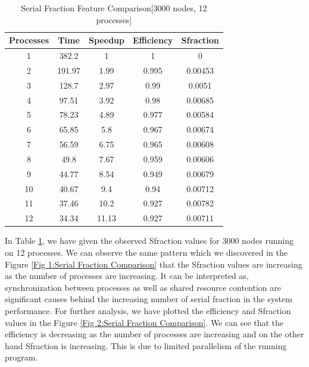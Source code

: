 \begin{table}[h!]
\caption{Serial Fraction Feature Comparison[3000 nodes, 12 processes]}
\label{tab:Table 2}
\centering
\begin{tabular}{|c|c|c|c|c|}
\hline
Processes & Time & Speedup & Efficiency & Sfraction\\
\hline
\hline
1&	382.2&	1&	1&	0\\
\hline

2&	191.97&	1.99&	0.995&	0.00453\\
\hline

3&	128.7&	2.97&	0.99&	0.0051\\
\hline

4&	97.51&	3.92&	0.98&	0.00685\\
\hline

5&	78.23&	4.89&	0.977&	0.00584\\
\hline

6&	65.85&	5.8&	0.967&	0.00674\\
\hline

7&	56.59&	6.75&	0.965&	0.00608\\
\hline

8&	49.8&	7.67&	0.959&	0.00606\\
\hline

9&	44.77&	8.54&	0.949&	0.00679\\
\hline

10&	40.67&	9.4&	0.94&	0.00712\\
\hline

11&	37.46&	10.2&	0.927&	0.00782\\
\hline

12&	34.34&	11.13&	0.927&	0.00711\\
\hline

\end{tabular}
\end{table}

In Table \ref{tab:Table 2}, we have given the observed Sfraction values for 3000 nodes running on 12 processes. We can observe the same pattern which we discovered in the Figure \ref{Fig 1:Serial Fraction Comparison} that the Sfraction values are increasing as the number of processes are increasing. It can be interpreted as, synchronization between processes as well as shared resource contention are significant causes behind the increasing number
of serial fraction in the system performance. For further analysis, we have plotted the efficiency and Sfraction values in the Figure \ref{Fig 2:Serial Fraction Comparison}. We can see that the efficiency is decreasing as the number of processes are increasing and on the other hand Sfraction is increasing. This is due to limited parallelism of the running program.

